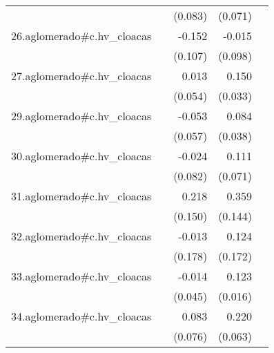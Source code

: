 {\begin{longtable}{l*{4}{D{.}{.}{-1}}}
            &                     &     (0.083)         &     (0.071)         &                     \\
\addlinespace
26.aglomerado#c.hv\_cloacas&                     &      -0.152         &      -0.015         &                     \\
            &                     &     (0.107)         &     (0.098)         &                     \\
\addlinespace
27.aglomerado#c.hv\_cloacas&                     &       0.013         &       0.150\sym{***}&                     \\
            &                     &     (0.054)         &     (0.033)         &                     \\
\addlinespace
29.aglomerado#c.hv\_cloacas&                     &      -0.053         &       0.084\sym{*}  &                     \\
            &                     &     (0.057)         &     (0.038)         &                     \\
\addlinespace
30.aglomerado#c.hv\_cloacas&                     &      -0.024         &       0.111         &                     \\
            &                     &     (0.082)         &     (0.071)         &                     \\
\addlinespace
31.aglomerado#c.hv\_cloacas&                     &       0.218         &       0.359\sym{*}  &                     \\
            &                     &     (0.150)         &     (0.144)         &                     \\
\addlinespace
32.aglomerado#c.hv\_cloacas&                     &      -0.013         &       0.124         &                     \\
            &                     &     (0.178)         &     (0.172)         &                     \\
\addlinespace
33.aglomerado#c.hv\_cloacas&                     &      -0.014         &       0.123\sym{***}&                     \\
            &                     &     (0.045)         &     (0.016)         &                     \\
\addlinespace
34.aglomerado#c.hv\_cloacas&                     &       0.083         &       0.220\sym{***}&                     \\
            &                     &     (0.076)         &     (0.063)         &                     \\

\end{longtable}}
